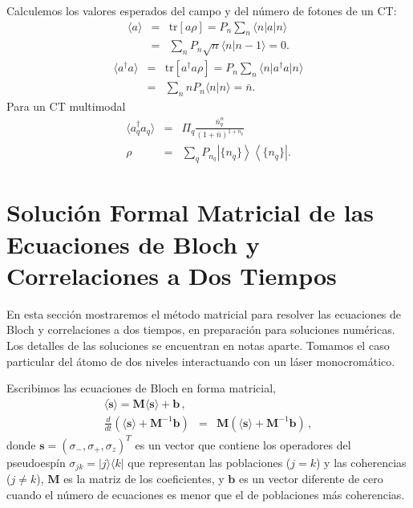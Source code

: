 \documentclass[twocolumn,aps,eqsecnum]{revtex4}
\newcommand{\adg}{a^{\dag}}
\providecommand{\vxp}[1]{\langle #1 \rangle}
\providecommand{\bra}[1]{\langle #1 \rvert}
\providecommand{\ket}[1]{\lvert #1 \rangle}
\providecommand{\braket}[2]{\langle #1 \rvert #2 \rangle}
\providecommand{\tr}[1]{\text{tr}\left[ #1 \right]}
\newcommand{\ketbra}[2]{\left| {#1} \right\rangle\left\langle {#2}\right|}
\begin{document}
Calculemos los valores esperados del campo y del n\'umero de 
fotones de un CT: 
%
\begin{eqnarray*}
\vxp{a} &=& \tr{a \rho} = P_n \sum_n \bra{n} a \ket{n}  \\ 
&=& \sum_n P_n \sqrt{n} \braket{n}{n-1} = 0 . 
\end{eqnarray*}
%
\begin{eqnarray*}
\vxp{\adg a} &=& \tr{\adg a \rho} 
    = P_n \sum_n \bra{n} \adg a \ket{n}  \\ 
&=& \sum_n n P_n \braket{n}{n} = \bar{n} . 
\end{eqnarray*}
Para un CT multimodal 
%
\begin{eqnarray*}
\vxp{\adg_q a_q} &=& \Pi_q \frac{\bar{n}^n_q}{(1+\bar{n})^{1+n_q}} \\ 
\rho &=& \sum_q P_{n_q} \ketbra{\{n_q\}}{\{n_q\}} .
\end{eqnarray*}


\section{Soluci\'on Formal Matricial de las Ecuaciones de Bloch y 
Correlaciones a Dos Tiempos} 
En esta secci\'on mostraremos el m\'etodo matricial para resolver las 
ecuaciones de Bloch y correlaciones a dos tiempos, en preparaci\'on 
para soluciones num\'ericas. Los detalles de las soluciones se encuentran 
en notas aparte. Tomamos el caso particular del \'atomo de dos niveles 
interactuando con un l\'aser monocrom\'atico.  

Escribimos las ecuaciones de Bloch en forma matricial,  
%
\begin{eqnarray} 	\label{eq:SBloch}
\langle \dot{\mathbf{s}} \rangle = 
	\mathbf{M} \langle \mathbf{s} \rangle +\mathbf{b}  \,,	\\ 
%
\frac{d}{dt} \left( \langle \mathbf{s} \rangle 
	+\mathbf{M}^{-1} \mathbf{b} \right) 
&=& \mathbf{M} \left( \langle \mathbf{s} \rangle 
	+\mathbf{M}^{-1}\mathbf{b} \right) 	\,, 	\nonumber 
\end{eqnarray}
donde $\mathbf{s} = (\sigma_-, \sigma_+,\sigma_z)^T$ es un vector que 
contiene los operadores del pseudoesp\'in 
$\sigma_{jk} = |j \rangle \langle k|$ que representan las poblaciones 
($j=k$) y las coherencias ($j \neq k$), $\mathbf{M}$ es la matriz de los 
coeficientes, y $\mathbf{b}$ es un vector diferente de cero cuando el 
n\'umero de ecuaciones es menor que el de poblaciones m\'as coherencias. 
\end{document}
